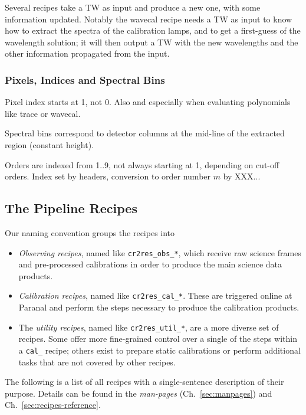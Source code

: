 Several recipes take a TW as input and produce a new one, with some information
updated. Notably the wavecal recipe needs a TW as input to know how to extract
the spectra of the calibration lamps, and to get a first-guess of the
wavelength solution; it will then output a TW with the new wavelengths and
the other information propagated from the input.



\subsubsection{Pixels, Indices and Spectral Bins}
Pixel index starts at 1, not 0. Also and especially when evaluating polynomials like trace or wavecal.

Spectral bins correspond to detector columns at the mid-line of the extracted
region (constant height).

Orders are indexed from 1..9, not always starting at 1, depending on cut-off
orders. Index set by headers, conversion to order number $m$ by XXX...

\subsection{The Pipeline Recipes}
\label{sec:recipes-quick}

Our naming convention groups the recipes into
\begin{itemize}
    \item \textit{Observing recipes}, named like \texttt{cr2res\_obs\_*}, which
    receive raw science frames and pre-processed calibrations in order to
    produce the main science data products.
    \item \textit{Calibration recipes}, named like \texttt{cr2res\_cal\_*}. These are triggered online at Paranal and perform the steps necessary to produce the calibration products.
    \item The \textit{utility recipes}, named like \texttt{cr2res\_util\_*}, are a more diverse set of recipes. Some offer more fine-grained control over a single of the steps within a \texttt{cal\_} recipe; others exist to prepare static calibrations or perform additional tasks that are not covered by other recipes.
\end{itemize}

The following is a list of all recipes with a single-sentence description of their purpose. Details can be found in the \emph{man-pages} (Ch.~\ref{sec:manpages}) and Ch.~\ref{sec:recipes-reference}.



